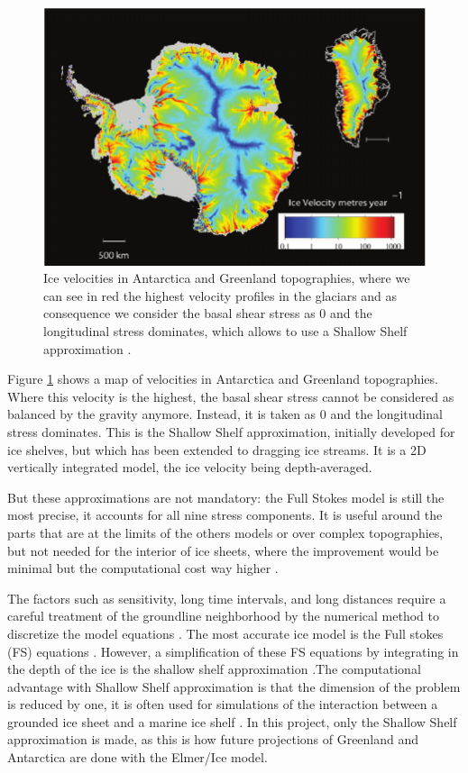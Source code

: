 \documentclass[a4paper,12pt]{article}
\begin{document}
\begin{figure}[!h]
	\centering
	\includegraphics[width=0.7\linewidth]{../fig/velocityglaciar}
	\caption{Ice velocities in Antarctica and Greenland topographies, where we can see in red the highest velocity profiles in the glaciars and as consequence we consider the basal shear stress as 0 and the longitudinal stress dominates, which allows to use a Shallow Shelf approximation \cite[]{allison2009ice}.}
	\label{velocityglaciar}
\end{figure}
Figure \ref{velocityglaciar} shows a map of velocities in Antarctica and Greenland topographies. Where this velocity is the highest, the basal shear stress cannot be considered as balanced by the gravity anymore. Instead, it is taken as 0 and the longitudinal stress dominates. This is the Shallow Shelf approximation, initially developed for ice shelves, but which has been extended to dragging ice streams. It is a 2D vertically integrated model, the ice velocity being depth-averaged.

But these approximations are not mandatory: the Full Stokes model is still the most precise, it accounts for all nine stress components. It is useful around the parts that are at the limits of the others models or over complex topographies, but not needed for the interior of ice sheets, where the improvement would be minimal but the computational cost way higher \cite[]{larour2012continental}.

The factors such as sensitivity, long time intervals, and long distances require a careful treatment of the groundline neighborhood by the numerical method to discretize the model equations \cite[]{cheng2019full}. The most accurate ice model is the Full stokes (FS) equations \cite{cheng2019full}. However, a simplification of these FS equations by integrating in the depth of the ice is the shallow shelf approximation \cite[]{macayeal1989large}.The computational advantage with Shallow Shelf approximation is that the dimension of the problem is reduced by one, it is often used for simulations of the interaction between a grounded ice sheet and a marine ice shelf \cite[]{cheng2019full}. 
In this project, only the Shallow Shelf approximation is made, as this is how future projections of Greenland and Antarctica are done with the Elmer/Ice model.
\end{document}
